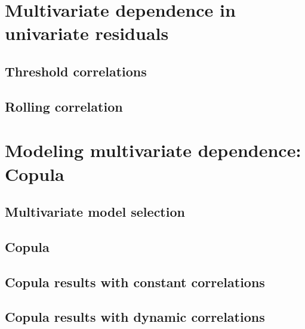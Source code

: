 
\section{Multivariate dependence in univariate residuals} %

\subsection{Threshold correlations}

\subsection{Rolling correlation}

\section{Modeling multivariate dependence: Copula} %


\subsection{Multivariate model selection}

\subsection{Copula}

\subsection{Copula results with constant correlations}

\subsection{Copula results with dynamic correlations}

